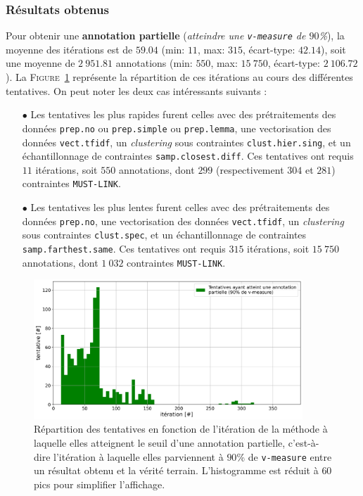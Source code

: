		\subsubsection{Résultats obtenus}
		
			Pour obtenir une \textbf{annotation partielle} (\textit{atteindre une \texttt{v-measure} de $90$\%}), la moyenne des itérations est de $59.04$ (min: $11$, max: $315$, écart-type: $42.14$), soit une moyenne de $2~951.81$ annotations (min: $550$, max: $15~750$, écart-type: $2~106.72$).
			La \textsc{Figure~\ref{figure:4.2.1-ETUDE-OPTIMISATION-HISTOGRAMME-ANNOTATION-PARTIELLE}} représente la répartition de ces itérations au cours des différentes tentatives.
			On peut noter les deux cas intéressants suivants :
			\begin{itemize}
				\item[$\bullet$] Les tentatives les plus rapides furent celles avec des prétraitements des données \texttt{prep.no} ou \texttt{prep.simple} ou \texttt{prep.lemma}, une vectorisation des données \texttt{vect.tfidf}, un \textit{clustering} sous contraintes \texttt{clust.hier.sing}, et un échantillonnage de contraintes \texttt{samp.closest.diff}.
				Ces tentatives ont requis $11$ itérations, soit $550$ annotations, dont $299$ (respectivement $304$ et $281$) contraintes \texttt{MUST-LINK}.
				\item[$\bullet$] Les tentatives les plus lentes furent celles avec des prétraitements des données \texttt{prep.no}, une vectorisation des données \texttt{vect.tfidf}, un \textit{clustering} sous contraintes \texttt{clust.spec}, et un échantillonnage de contraintes \texttt{samp.farthest.same}.
				Ces tentatives ont requis $315$ itérations, soit $15~750$ annotations, dont $1~032$ contraintes \texttt{MUST-LINK}.
			\end{itemize}
			\begin{figure}[!htb]
				\centering
				\includegraphics[width=0.90\textwidth]{figures/etude-efficience-histogramme-annotation-partielle}
				\caption{
					Répartition des tentatives en fonction de l'itération de la méthode à laquelle elles atteignent le seuil d'une annotation partielle, c'est-à-dire l'itération à laquelle elles parviennent à $90$\% de \texttt{v-measure} entre un résultat obtenu et la vérité terrain.
					L'histogramme est réduit à $60$ pics pour simplifier l'affichage.
				}
				\label{figure:4.2.1-ETUDE-OPTIMISATION-HISTOGRAMME-ANNOTATION-PARTIELLE}
			\end{figure}
